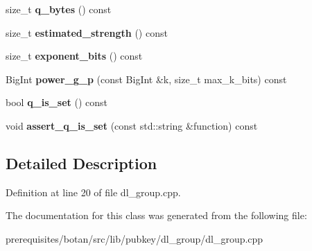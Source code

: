 \begin{DoxyCompactItemize}
\mbox{\label{class_botan_1_1_d_l___group___data_a35d3423711ae3533c495b2f6f98e12df}} 
size\+\_\+t {\bfseries q\+\_\+bytes} () const
\item 
\mbox{\label{class_botan_1_1_d_l___group___data_ac5978b3c57d44c49017ac8f013a96f83}} 
size\+\_\+t {\bfseries estimated\+\_\+strength} () const
\item 
\mbox{\label{class_botan_1_1_d_l___group___data_aa7509e62252ad5d965a7a699141e2e84}} 
size\+\_\+t {\bfseries exponent\+\_\+bits} () const
\item 
\mbox{\label{class_botan_1_1_d_l___group___data_ab97e4abffce360cf06cbcca9dc140852}} 
Big\+Int {\bfseries power\+\_\+g\+\_\+p} (const Big\+Int \&k, size\+\_\+t max\+\_\+k\+\_\+bits) const
\item 
\mbox{\label{class_botan_1_1_d_l___group___data_ac762d89997b189ef33a5c50c5a3d47f9}} 
bool {\bfseries q\+\_\+is\+\_\+set} () const
\item 
\mbox{\label{class_botan_1_1_d_l___group___data_a371b311b179d43d99b67a9f7b56702bc}} 
void {\bfseries assert\+\_\+q\+\_\+is\+\_\+set} (const std\+::string \&function) const
\end{DoxyCompactItemize}


\subsection{Detailed Description}


Definition at line 20 of file dl\+\_\+group.\+cpp.



The documentation for this class was generated from the following file\+:\begin{DoxyCompactItemize}
\item 
prerequisites/botan/src/lib/pubkey/dl\+\_\+group/dl\+\_\+group.\+cpp\end{DoxyCompactItemize}
